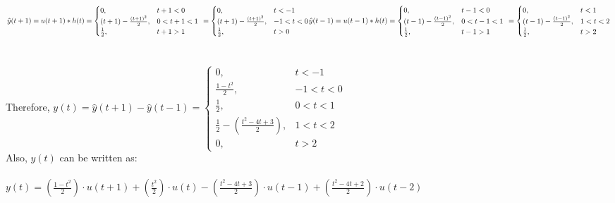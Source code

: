 \documentclass[12pt]{article}
\begin{document}
    \begin{math}
      \resizebox{.9\hsize}{!}{$
      \hat{y}(t+1) = u(t+1)*h(t) = \begin{cases}
      0,& t+1 < 0\\
      (t+1) - \frac{(t+1)^{2}}{2},& 0 < t+1 <1\\
     \frac{1}{2},& t+1 > 1
    \end{cases} \ =  \begin{cases}
      0,& t < -1\\
      (t+1) - \frac{(t+1)^{2}}{2},& -1 < t < 0\\
     \frac{1}{2},& t > 0
    \end{cases}$}  \\ \\ \\
    \resizebox{.9\hsize}{!}{$
    \hat{y}(t-1) = u(t-1)*h(t) = \begin{cases}
      0,& t-1 < 0\\
      (t-1) - \frac{(t-1)^{2}}{2},& 0 < t-1 <1\\
     \frac{1}{2},& t-1 > 1
    \end{cases} \ =  \begin{cases}
      0,& t < 1\\
      (t-1) - \frac{(t-1)^{2}}{2},& 1 < t < 2\\
     \frac{1}{2},& t > 2
    \end{cases}$} \end{math}\\ \\ \\
    Therefore, \begin{math} y(t) = \hat{y}(t+1) - \hat{y}(t-1) =  \begin{cases}
      0,& t < -1\\
      \frac{1-t^{2}}{2},& -1 < t < 0\\
     \frac{1}{2},& 0 < t < 1\\
     \frac{1}{2} - (\frac{t^{2}-4t+3}{2}),& 1 < t < 2\\
     0,& t > 2
    \end{cases}  \end{math} \\ 
    Also, \(y(t)\) can be written as: \\ \\
    \begin{math} y(t) = (\frac{1-t^2}{2})\cdot u(t+1) + (\frac{t^{2}}{2})\cdot u(t) - (\frac{t^2-4t+3}{2})\cdot u(t-1) + (\frac{t^2-4t+2}{2})\cdot u(t-2)\end{math} 
\end{document}
